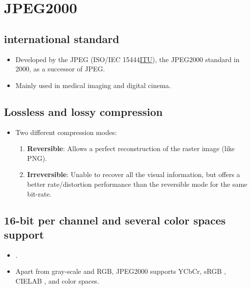 \chapter{JPEG2000}
\label{cha:JPEG2000}

\section{ international standard}
\begin{itemize}
\item Developed by the \gls{JPEG} (ISO/IEC 15444\href{https://www.itu.int}{ITU}),
  the JPEG2000 standard \cite{taubman2002jpeg2000,wikipedia_J2K} in 2000, as a successor of
  \gls{JPEG}.
\item Mainly used in medical imaging and digital cinema.
\end{itemize}

\section{Lossless and lossy compression}
\begin{itemize}
\item Two different compression modes:
  \begin{enumerate}
  \item \textbf{Reversible}: Allows a perfect reconstruction of the raster image (like \gls{PNG}).
  \item \textbf{Irreversible}: Unable to recover all the visual
    information, but offers a better rate/distortion performance than
    the reversible mode for the same bit-rate.
  \end{enumerate}
\end{itemize}

\section{16-bit per channel and several color spaces support}
\begin{itemize}
\item {}.
\item Apart from gray-scale and \gls{RGB}, JPEG2000 supports
  \gls{YCbCr}, \gls{sRGB} \cite{sRGB_wikipedia}, \gls{CIELAB}
  \cite{CIELAB_wikipedia}, and  \cite{houchin2001specification} color spaces.
\end{itemize}

